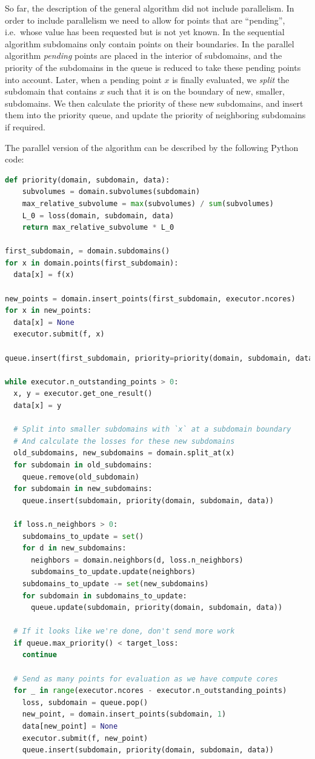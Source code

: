 So far, the description of the general algorithm did not include parallelism.
In order to include parallelism we need to allow for points that are ``pending'', i.e.~whose value has been requested but is not yet known.
In the sequential algorithm subdomains only contain points on their boundaries.
In the parallel algorithm \emph{pending} points are placed in the interior of subdomains, and the priority of the subdomains in the queue is reduced to take these pending points into account.
Later, when a pending point $x$ is finally evaluated, we \emph{split} the subdomain that contains $x$ such that it is on the boundary of new, smaller, subdomains.
We then calculate the priority of these new subdomains, and insert them into the priority queue, and update the priority of neighboring subdomains if required.


The parallel version of the algorithm can be described by the following Python code:

\begin{lstlisting}[language=Python]
def priority(domain, subdomain, data):
    subvolumes = domain.subvolumes(subdomain)
    max_relative_subvolume = max(subvolumes) / sum(subvolumes)
    L_0 = loss(domain, subdomain, data)
    return max_relative_subvolume * L_0

first_subdomain, = domain.subdomains()
for x in domain.points(first_subdomain):
  data[x] = f(x)

new_points = domain.insert_points(first_subdomain, executor.ncores)
for x in new_points:
  data[x] = None
  executor.submit(f, x)

queue.insert(first_subdomain, priority=priority(domain, subdomain, data))

while executor.n_outstanding_points > 0:
  x, y = executor.get_one_result()
  data[x] = y

  # Split into smaller subdomains with `x` at a subdomain boundary
  # And calculate the losses for these new subdomains
  old_subdomains, new_subdomains = domain.split_at(x)
  for subdomain in old_subdomains:
    queue.remove(old_subdomain)
  for subdomain in new_subdomains:
    queue.insert(subdomain, priority(domain, subdomain, data))

  if loss.n_neighbors > 0:
    subdomains_to_update = set()
    for d in new_subdomains:
      neighbors = domain.neighbors(d, loss.n_neighbors)
      subdomains_to_update.update(neighbors)
    subdomains_to_update -= set(new_subdomains)
    for subdomain in subdomains_to_update:
      queue.update(subdomain, priority(domain, subdomain, data))

  # If it looks like we're done, don't send more work
  if queue.max_priority() < target_loss:
    continue

  # Send as many points for evaluation as we have compute cores
  for _ in range(executor.ncores - executor.n_outstanding_points)
    loss, subdomain = queue.pop()
    new_point, = domain.insert_points(subdomain, 1)
    data[new_point] = None
    executor.submit(f, new_point)
    queue.insert(subdomain, priority(domain, subdomain, data))
\end{lstlisting}

